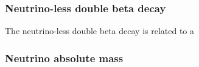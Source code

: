 

\subsubsection{Neutrino-less double beta decay}
The neutrino-less double beta decay is related to a 


\subsubsection{Neutrino absolute mass}
